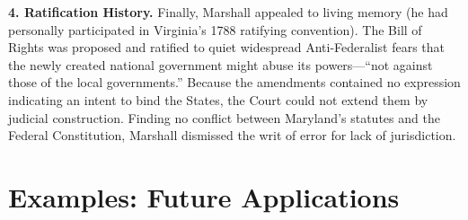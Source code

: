 \documentclass[12pt]{article}
\begin{document}
\textbf{4. Ratification History.} Finally, Marshall appealed to living memory (he had personally participated in Virginia's 1788 ratifying convention). The Bill of Rights was proposed and ratified to quiet widespread Anti-Federalist fears that the newly created national government might abuse its powers---``not against those of the local governments.'' Because the amendments contained no expression indicating an intent to bind the States, the Court could not extend them by judicial construction. Finding no conflict between Maryland's statutes and the Federal Constitution, Marshall dismissed the writ of error for lack of jurisdiction.

\section{Examples: Future Applications}
\end{document}
